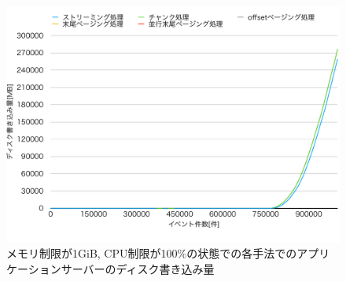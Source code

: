 \documentclass[../../../main]{subfiles}
\begin{document}
    \begin{figure}[H]
        \centering
        \includegraphics[width=12cm]{graph}
        \caption{メモリ制限が1GiB, CPU制限が100\%の状態での各手法でのアプリケーションサーバーのディスク書き込み量}
        \label{fig:app-disk-in}
    \end{figure}
\end{document}
